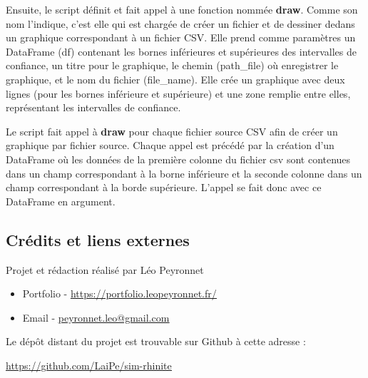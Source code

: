 \documentclass[12pt,french,titlepage]{article}
\begin{document}
Ensuite, le script définit et fait appel à une fonction nommée \textbf{draw}. Comme son nom l'indique, c'est elle qui est chargée de créer un fichier et de dessiner dedans un graphique correspondant à un fichier CSV. Elle prend comme paramètres un DataFrame (df) contenant les bornes inférieures et supérieures des intervalles de confiance, un titre pour le graphique, le chemin (path\_file) où enregistrer le graphique, et le nom du fichier (file\_name). Elle crée un graphique avec deux lignes (pour les bornes inférieure et supérieure) et une zone remplie entre elles, représentant les intervalles de confiance.

Le script fait appel à \textbf{draw} pour chaque fichier source CSV afin de créer un graphique par fichier source. Chaque appel est précédé par la création d'un DataFrame où les données de la première colonne du fichier csv sont contenues dans un champ correspondant à la borne inférieure et la seconde colonne dans un champ correspondant à la borde supérieure. L'appel se fait donc avec ce DataFrame en argument.

\newpage





\subsection{Crédits et liens externes}
Projet et rédaction réalisé par Léo Peyronnet
\begin{itemize}
\item Portfolio - \underline{\href{https://portfolio.leopeyronnet.fr/}{https://portfolio.leopeyronnet.fr/}}
\item Email - \underline{\href{mailto:peyronnet.leo@gmail.com}{peyronnet.leo@gmail.com}}\\
\end{itemize}

Le dépôt distant du projet est trouvable sur Github à cette adresse :

\underline{\href{https://github.com/LaiPe/sim-rhinite}{https://github.com/LaiPe/sim-rhinite}}
\end{document}
